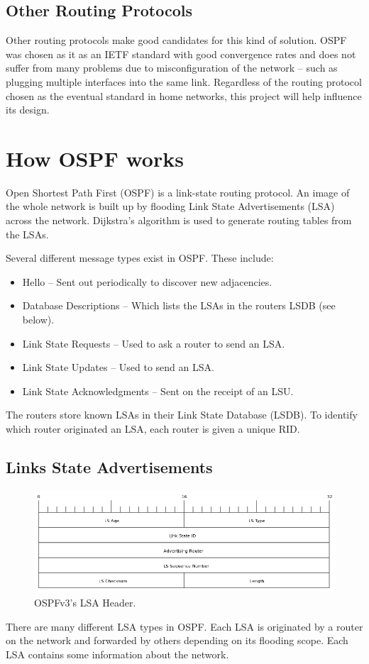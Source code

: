 \documentclass[12pt,a4paper,twoside]{report}
\begin{document}
\subsection{Other Routing Protocols}
Other routing protocols make good candidates for this kind of solution. OSPF
was chosen as it as an IETF standard with good convergence rates and does not
suffer from many problems due to misconfiguration of the network -- such as
plugging multiple interfaces into the same link. Regardless of the routing
protocol chosen as the eventual standard in home networks, this project will
help influence its design.

\section{How OSPF works}
Open Shortest Path First (OSPF) is a link-state routing protocol. An image of
the whole network is built up by flooding Link State Advertisements (LSA)
across the network. Dijkstra's algorithm is used to generate routing tables from
the LSAs.

Several different message types exist in OSPF\@. These include:
\begin{itemize}
 \item Hello -- Sent out periodically to discover new adjacencies.
 \item Database Descriptions -- Which lists the LSAs in the routers LSDB (see below).
 \item Link State Requests -- Used to ask a router to send an LSA.
 \item Link State Updates -- Used to send an LSA.
 \item Link State Acknowledgments -- Sent on the receipt of an LSU.
\end{itemize}

The routers store known LSAs in their Link State Database
(LSDB). To identify which router
originated an LSA, each router is given a unique RID.

\subsection{Links State Advertisements}
\begin{figure}
\begin{center}
	\includegraphics[width=\linewidth]{../Diagrams/Packets/LSA-header.png}
	\caption{OSPFv3's LSA Header.}\label{fig:LSA-header}
\end{center}
\end{figure}
There are many different LSA types in OSPF\@. Each LSA is originated by
a router on the network and forwarded by others depending on its
flooding scope. Each LSA contains some information about the network. 
 
\end{document}
